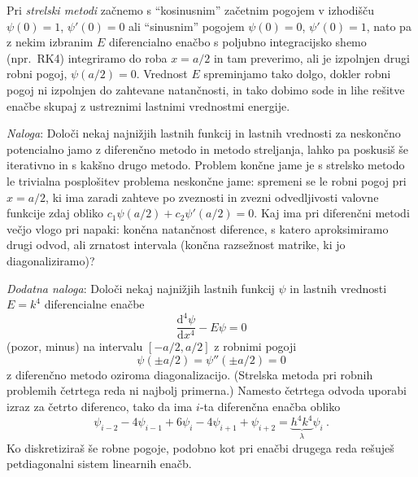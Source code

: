 \documentclass[slovene,11pt,a4paper]{article}
\newcommand{\ddd}{\mathrm{d}}
\newcommand{\Dd}[3][{}]{\frac{\ddd^{#1} #2}{\ddd #3^{#1}}}
\begin{document}
\smallskip

Pri {\sl strelski metodi\/} začnemo s ``kosinusnim'' začetnim pogojem
v izhodišču $\psi(0)=1$, $\psi'(0)=0$ ali ``sinusnim'' pogojem
$\psi(0)=0$, $\psi'(0)=1$, nato pa z nekim izbranim $E$ diferencialno
enačbo s poljubno integracijsko shemo (npr.~RK4) integriramo do roba
$x=a/2$ in tam preverimo, ali je izpolnjen drugi robni pogoj, $\psi(a/2)=0$.
Vrednost $E$ spreminjamo tako dolgo, dokler robni pogoj ni izpolnjen do
zahtevane natančnosti, in tako dobimo sode in lihe rešitve enačbe
skupaj z ustreznimi lastnimi vrednostmi energije.

\medskip

{\it Naloga\/}: Določi nekaj najnižjih lastnih funkcij in lastnih
vrednosti za
neskončno potencialno jamo z diferenčno metodo in metodo streljanja, lahko pa poskusiš še iterativno in 
s kakšno drugo metodo. 
Problem končne jame je s strelsko metodo le trivialna posplošitev
problema neskončne jame: spremeni se le robni pogoj pri $x=a/2$,
ki ima zaradi zahteve po zveznosti in zvezni odvedljivosti valovne
funkcije zdaj obliko $c_1\psi(a/2) + c_2\psi'(a/2) = 0$. 
Kaj ima pri diferenčni metodi večjo vlogo pri napaki:
končna natančnost diference, s katero aproksimiramo drugi odvod,
ali zrnatost intervala (končna razsežnost matrike, ki jo
diagonaliziramo)?

\bigskip

{\it Dodatna naloga\/}: Določi nekaj najnižjih lastnih funkcij $\psi$
in lastnih vrednosti $E=k^4$ diferencialne enačbe
\begin{equation*}
\Dd[4]{\psi}{x} - E\psi = 0
\end{equation*}
(pozor, minus) na intervalu $[-a/2,a/2]$ z robnimi pogoji
\begin{equation*}
\psi(\pm a/2) = \psi''(\pm a/2) = 0
\end{equation*}
z diferenčno metodo oziroma diagonalizacijo.  (Strelska metoda
pri robnih problemih četrtega reda ni najbolj primerna.)
Namesto četrtega odvoda uporabi izraz za četrto diferenco,
tako da ima $i$-ta diferenčna enačba obliko
\begin{equation*}
\psi_{i-2} - 4\psi_{i-1} + 6\psi_i - 4\psi_{i+1} + \psi_{i+2}
= \underbrace{h^4k^4}_\lambda \psi_i \>.  
\end{equation*}
Ko diskretiziraš še robne pogoje, podobno kot pri enačbi
drugega reda rešuješ petdiagonalni sistem linearnih enačb.
\end{document}
